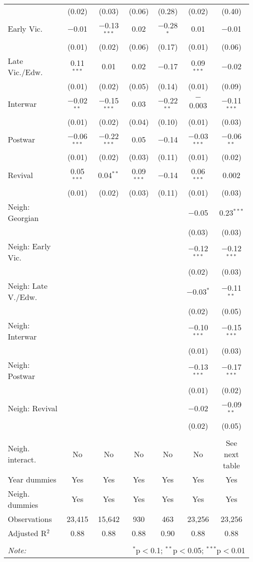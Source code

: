 \begin{table}[!htbp]
\begin{tabular}{@{\extracolsep{5pt}}lcccccc}
  & (0.02) & (0.03) & (0.06) & (0.28) & (0.02) & (0.40) \\ 
  Early Vic. & $-$0.01 & $-$0.13$^{***}$ & 0.02 & $-$0.28$^{*}$ & 0.01 & $-$0.01 \\ 
  & (0.01) & (0.02) & (0.06) & (0.17) & (0.01) & (0.06) \\ 
  Late Vic./Edw. & 0.11$^{***}$ & 0.01 & 0.02 & $-$0.17 & 0.09$^{***}$ & $-$0.02 \\ 
  & (0.01) & (0.02) & (0.05) & (0.14) & (0.01) & (0.09) \\ 
  Interwar & $-$0.02$^{**}$ & $-$0.15$^{***}$ & 0.03 & $-$0.22$^{**}$ & $-$0.003 & $-$0.11$^{***}$ \\ 
  & (0.01) & (0.02) & (0.04) & (0.10) & (0.01) & (0.03) \\ 
  Postwar & $-$0.06$^{***}$ & $-$0.22$^{***}$ & 0.05 & $-$0.14 & $-$0.03$^{***}$ & $-$0.06$^{**}$ \\ 
  & (0.01) & (0.02) & (0.03) & (0.11) & (0.01) & (0.02) \\ 
  Revival & 0.05$^{***}$ & 0.04$^{**}$ & 0.09$^{***}$ & $-$0.14 & 0.06$^{***}$ & 0.002 \\ 
  & (0.01) & (0.02) & (0.03) & (0.11) & (0.01) & (0.03) \\ 
  Neigh: Georgian &  &  &  &  & $-$0.05 & 0.23$^{***}$ \\ 
  &  &  &  &  & (0.03) & (0.03) \\ 
  Neigh: Early Vic. &  &  &  &  & $-$0.12$^{***}$ & $-$0.12$^{***}$ \\ 
  &  &  &  &  & (0.02) & (0.03) \\ 
  Neigh: Late V./Edw. &  &  &  &  & $-$0.03$^{*}$ & $-$0.11$^{**}$ \\ 
  &  &  &  &  & (0.02) & (0.05) \\ 
  Neigh: Interwar &  &  &  &  & $-$0.10$^{***}$ & $-$0.15$^{***}$ \\ 
  &  &  &  &  & (0.01) & (0.03) \\ 
  Neigh: Postwar &  &  &  &  & $-$0.13$^{***}$ & $-$0.17$^{***}$ \\ 
  &  &  &  &  & (0.01) & (0.02) \\ 
  Neigh: Revival &  &  &  &  & $-$0.02 & $-$0.09$^{**}$ \\ 
  &  &  &  &  & (0.02) & (0.05) \\ 
 \hline \\[-1.8ex] 
Neigh. interact. & No & No & No & No & No & See next table \\ 
Year dummies & Yes & Yes & Yes & Yes & Yes & Yes \\ 
Neigh. dummies & Yes & Yes & Yes & Yes & Yes & Yes \\ 
Observations & 23,415 & 15,642 & 930 & 463 & 23,256 & 23,256 \\ 
Adjusted R$^{2}$ & 0.88 & 0.88 & 0.88 & 0.90 & 0.88 & 0.88 \\ 
\hline 
\hline \\[-1.8ex] 
\textit{Note:}  & \multicolumn{6}{r}{$^{*}$p$<$0.1; $^{**}$p$<$0.05; $^{***}$p$<$0.01} \\ 
\end{tabular} 
\end{table} 
